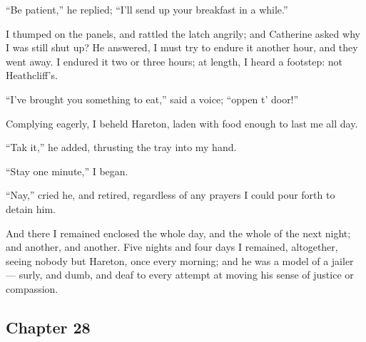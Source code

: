 \par “Be patient,” he replied; “I'll send up your breakfast in a while.”
\par I thumped on the panels, and rattled the latch angrily; and Catherine asked why I was still shut up? He answered, I must try to endure it another hour, and they went away. I endured it two or three hours; at length, I heard a footstep: not Heathcliff's.
\par “I've brought you something to eat,” said a voice; “oppen t' door!”
\par Complying eagerly, I beheld Hareton, laden with food enough to last me all day.
\par “Tak it,” he added, thrusting the tray into my hand.
\par “Stay one minute,” I began.
\par “Nay,” cried he, and retired, regardless of any prayers I could pour forth to detain him.
\par And there I remained enclosed the whole day, and the whole of the next night; and another, and another. Five nights and four days I remained, altogether, seeing nobody but Hareton, once every morning; and he was a model of a jailer — surly, and dumb, and deaf to every attempt at moving his sense of justice or compassion.






\subsection*{Chapter 28}

